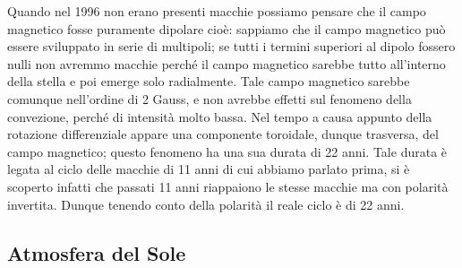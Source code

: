 \documentclass[a4paper,11pt]{article}
\begin{document}
        Quando nel 1996 non erano presenti macchie possiamo pensare che il campo magnetico fosse puramente dipolare cioè: sappiamo che il campo magnetico può essere sviluppato in serie di multipoli; se tutti i termini superiori al dipolo fossero nulli non avremmo macchie perché il campo magnetico sarebbe tutto all'interno della stella e poi emerge solo radialmente.
        Tale campo magnetico sarebbe comunque nell'ordine di 2 Gauss, e non avrebbe effetti sul fenomeno della convezione, perché di intensità molto bassa.
        Nel tempo a causa appunto della rotazione differenziale appare una componente toroidale, dunque trasversa, del campo magnetico; questo fenomeno ha una sua durata di 22 anni.
        Tale durata è legata al ciclo delle macchie di 11 anni di cui abbiamo  parlato prima, si è scoperto infatti che passati 11 anni riappaiono le stesse macchie ma con polarità invertita.
        Dunque tenendo conto della polarità il reale ciclo è di 22 anni.

\subsection{Atmosfera del Sole}
\end{document}
